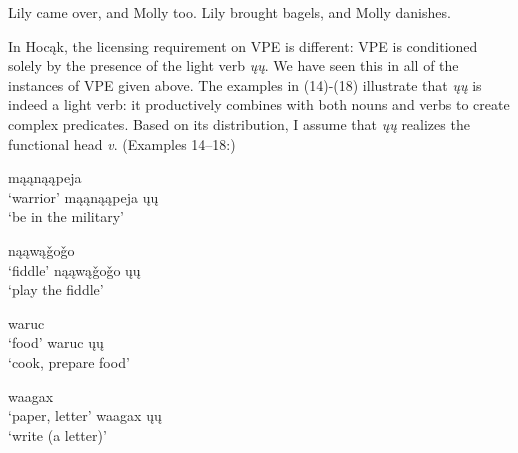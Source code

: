 \documentclass[output=paper]{LSP/langsci}
\begin{document}
\begin{exe}
\ex
\begin{xlist}
\ex
Lily came over, and Molly too.
\ex
Lily brought bagels, and Molly danishes.
\end{xlist}
\end{exe}

In Hocąk, the licensing requirement on VPE is different: VPE is conditioned solely by the presence of the light verb \emph{ųų}. We have seen this in all of the instances of VPE given above. The examples in (14)-(18) illustrate that \emph{ųų} is indeed a light verb: it productively combines with both nouns and verbs to create complex predicates. Based on its distribution, I assume that \emph{ųų} realizes the functional head \emph{v}. (Examples 14--18:\citealt{Hartmann2012})

\begin{exe}
\ex
\begin{multicols}{2}
\begin{xlist}
\ex
mąąnąąpeja\\
`warrior'
\ex
mąąnąąpeja ųų\\
`be in the military'
\end{xlist}
\end{multicols}
\end{exe}

\begin{exe}
\ex
\begin{multicols}{2}
\begin{xlist}
\ex
nąąwą\v{g}o\v{g}o\\
`fiddle'
\ex
nąąwą\v{g}o\v{g}o ųų\\
`play the fiddle'
\end{xlist}
\end{multicols}
\end{exe}

\begin{exe}
\ex
\begin{multicols}{2}
\begin{xlist}
\ex
waruc\\
`food'
\ex
waruc ųų\\
`cook, prepare food'
\end{xlist}
\end{multicols}
\end{exe}

\begin{exe}
\ex
\begin{multicols}{2}
\begin{xlist}
\ex
waagax\\
`paper, letter'
\ex
waagax ųų\\
`write (a letter)'
\end{xlist}
\end{multicols}
\end{exe}
\end{document}
